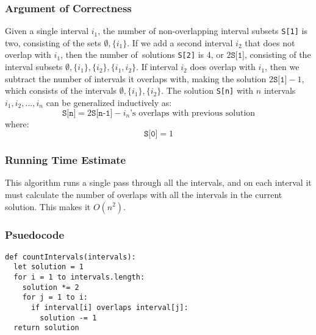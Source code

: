 \documentclass[letterpaper, 12pt]{math}
\begin{document}
\subsubsection*{Argument of Correctness}
Given a single interval \( i_1 \), the number of non-overlapping interval
subsets \texttt{S[1]} is two, consisting of the sets \( \emptyset,\{i_1\} \).
If we add a second interval \( i_2 \) that does not overlap with \( i_1 \),
then the number of\ solutions \texttt{S[2]} is 4, or \( 2\texttt{S[1]} \),
consisting of the interval subsets \( \emptyset,\{i_1\},\{i_2\},\{i_1,i_2\} \).
If interval \( i_2 \) does overlap with \( i_1 \), then we subtract the number
of intervals it overlaps with, making the solution \( 2\texttt{S[1]}-1 \), which
consists of the intervals \( \emptyset,\{i_1\},\{i_2\} \). The solution
\texttt{S[n]} with \( n \) intervals \( i_1,i_2,\dots,i_n \) can be
generalized inductively as:
\[ \texttt{S[n]} =
  2\texttt{S[n-1]}-i_n\text{'s overlaps with previous solution} \]
where:
\[ \texttt{S[0]} = 1 \]

\subsubsection*{Running Time Estimate}
This algorithm runs a single pass through all the intervals, and on each
interval it must calculate the number of overlaps with all the intervals in
the current solution. This makes it \( O(n^2) \).

\subsubsection*{Psuedocode}
\begin{lstlisting}
def countIntervals(intervals):
  let solution = 1
  for i = 1 to intervals.length:
    solution *= 2
    for j = 1 to i:
      if interval[i] overlaps interval[j]:
        solution -= 1
  return solution
\end{lstlisting}
\end{document}
